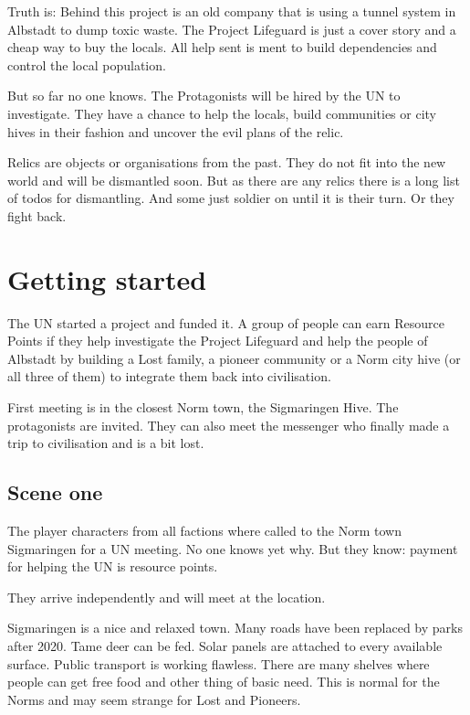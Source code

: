 
Truth is: Behind this project is an old company that is using a tunnel system in Albstadt to dump toxic waste. The Project Lifeguard is just a  cover story and a cheap way to buy the locals. All help sent is ment to build dependencies and control the local population.

But so far no one knows. The Protagonists will be hired by the UN to investigate. They have a chance to help the locals, build communities or city hives in their fashion and uncover the evil plans of the relic.

\begin{sidebarBox}[title=Relics]
Relics are objects or organisations from the past. They do not fit into the new world and will be dismantled soon. But as there are any relics there is a long list of todos for dismantling. And some just soldier on until it is their turn. Or they fight back.
\end{sidebarBox}

\section{Getting started}

The UN started a project and funded it. A group of people can earn Resource Points if they help investigate the Project Lifeguard and help the people of Albstadt by building a Lost family, a pioneer community or a Norm city hive (or all three of them) to integrate them back into civilisation.

First meeting is in the closest Norm town, the Sigmaringen Hive. The protagonists are invited. They can also meet the messenger who finally made a trip to civilisation and is a bit lost.


\subsection{Scene one}

The player characters from all factions where called to the Norm town Sigmaringen for a UN meeting. No one knows yet why. But they know: payment for helping the UN is resource points.

They arrive independently and will meet at the location.

Sigmaringen is a nice and relaxed town. Many roads have been replaced by parks after 2020. Tame deer can be fed. Solar panels are attached to every available surface. Public transport is working flawless. There are many shelves where people can get free food and other thing of basic need. This is normal for the Norms and may seem strange for Lost and Pioneers.

